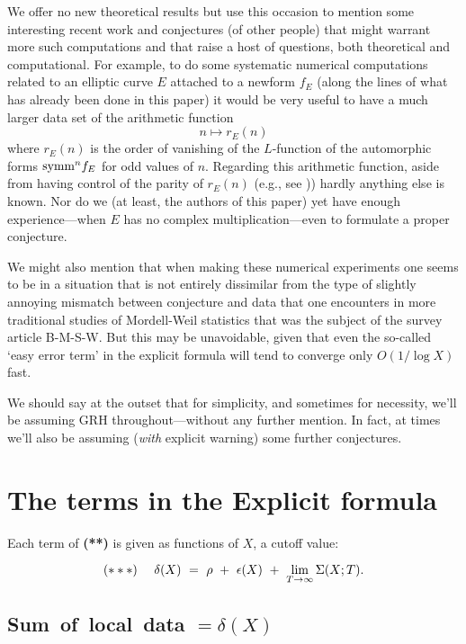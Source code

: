 \documentclass[11pt]{article}
\theoremstyle{plain}
\theoremstyle{definition}
\numberwithin{equation}{section}
\numberwithin{figure}{section}
\numberwithin{table}{section}
\begin{document}
 We offer no new theoretical results but use this occasion to mention some interesting recent work and conjectures  (of other people)  that might warrant more such computations and that raise a host of questions, both theoretical and computational.   For example, to do some systematic numerical computations related to an elliptic curve $E$ attached to a newform $f_E$  (along the lines of what has already been done in this paper)  it would be very useful to have a much larger data set  of the arithmetic function  $$n \mapsto r_E(n)$$
 where $r_E(n)$ is the order of vanishing of the $L$-function of the automorphic forms ${\rm symm}^n f_E$ for odd values of $n$.  Regarding this arithmetic function, aside from having control of the parity of   $r_E(n)$  (e.g., see \cite{DMW}))  hardly anything else is known. Nor do we (at least, the authors of this paper)  yet have enough experience---when $E$ has no complex multiplication---even to formulate a proper conjecture.

 We might also mention that when making these numerical experiments one seems to be in a situation  that is not entirely dissimilar from the type of slightly annoying mismatch between conjecture and data that one encounters in more traditional studies of Mordell-Weil statistics  that was the subject of the survey article B-M-S-W.  But this may be unavoidable, given that even  the so-called  `easy error term' in the explicit formula will tend to converge  only $O(1/\log X)$ fast.

 We should say at the outset that for simplicity, and sometimes for necessity, we'll be assuming GRH throughout---without any further mention. In fact, at times we'll also be assuming ({\it with} explicit warning) some further conjectures.

\hskip20pt{\small{\tableofcontents}}
 \section{The terms in the Explicit formula}



   Each  term of {\bf (**)}  is given as functions of $X$, a cutoff value:


$${\bf(***)}\ \ \ \  \delta(X)   \ = \   \rho \ +\ \epsilon(X) \ +\  \lim_{T\to \infty}\Sigma(X; T).$$


 \subsection{ Sum\ of\ local\ data $= \delta(X)  $}
\end{document}
